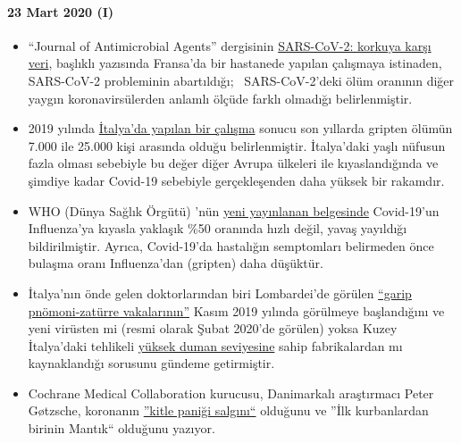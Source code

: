 \hypertarget{23-mart-2020-i}{%
\paragraph{23 Mart 2020 (I)}\label{23-mart-2020-i}}

\begin{itemize}
\tightlist
\item
  ``Journal of Antimicrobial Agents'' dergisinin
  \href{https://www.sciencedirect.com/science/article/abs/pii/S0924857920300972}{SARS-CoV-2:
  korkuya karşı veri}, başlıklı yazısında Fransa'da bir hastanede
  yapılan çalışmaya istinaden, SARS-CoV-2 probleminin abartıldığı;~
  SARS-CoV-2'deki ölüm oranının diğer yaygın koronavirsülerden anlamlı
  ölçüde farklı olmadığı belirlenmiştir.
\item
  2019 yılında
  \href{https://www.ijidonline.com/article/S1201-9712(19)30328-5/fulltext}{İtalya'da
  yapılan bir çalışma} sonucu son yıllarda gripten ölümün 7.000 ile
  25.000 kişi arasında olduğu belirlenmiştir. İtalya'daki yaşlı nüfusun
  fazla olması sebebiyle bu değer diğer Avrupa ülkeleri ile
  kıyaslandığında ve şimdiye kadar Covid-19 sebebiyle gerçekleşenden
  daha yüksek bir rakamdır.~ 
\item
  WHO (Dünya Sağlık Örgütü) 'nün
  \href{https://www.who.int/news-room/q-a-detail/q-a-similarities-and-differences-covid-19-and-influenza}{yeni
  yayınlanan belgesinde} Covid-19'un Influenza'ya kıyasla yaklaşık \%50
  oranında hızlı değil, yavaş yayıldığı bildirilmiştir. Ayrıca,
  Covid-19'da hastalığın semptomları belirmeden önce bulaşma oranı
  Influenza'dan (gripten) daha düşüktür.
\item
  İtalya'nın önde gelen doktorlarından biri Lombardei'de görülen
  \href{https://www.scmp.com/news/china/society/article/3076334/coronavirus-strange-pneumonia-seen-lombardy-november-leading}{``garip
  pnömoni-zatürre vakalarının''} Kasım 2019 yılında görülmeye
  başlandığını ve yeni virüsten mi (resmi olarak Şubat 2020'de görülen)
  yoksa Kuzey İtalya'daki tehlikeli
  \href{https://www.thelocal.it/20170131/our-lungs-are-breaking-smog-levels-way-above-safe-limits-in-northern-italy}{yüksek
  duman seviyesine} sahip fabrikalardan mı kaynaklandığı sorusunu
  gündeme getirmiştir.
\item
  Cochrane Medical Collaboration kurucusu, Danimarkalı araştırmacı Peter
  Gøtzsche, koronanın
  \href{https://www.deadlymedicines.dk/corona-an-epidemic-of-mass-panic/}{''kitle
  paniği salgını``} olduğunu ve ''İlk kurbanlardan birinin Mantık``
  olduğunu yazıyor.\\
\end{itemize}

